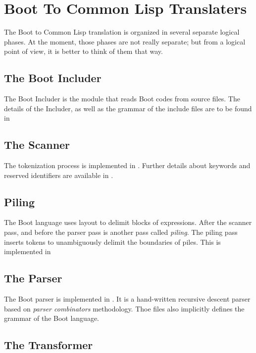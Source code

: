 \documentclass{article}
\begin{document}
\section{Boot To Common Lisp Translaters}
\label{sec:boot-to-cl}

The Boot to Common Lisp translation is organized in several 
separate logical phases.  At the moment, those phases are not
really separate; but from a logical point of view, it is better
to think of them that way.


\subsection{The Boot Includer}
\label{sec:boot-to-cl:includer}

The Boot Includer is the module that reads Boot codes from source files.
The details of the Includer, as well as the grammar of the include
files are to be found in 


\subsection{The Scanner}
\label{sec:boot-to-cl:scanner}

The tokenization process is implemented in .  Further 
details about keywords and reserved identifiers are available in
.


\subsection{Piling}
\label{sec:boot-to-cl:piling}

The Boot language uses layout to delimit blocks of expressions. After
the scanner pass, and before the parser pass is another pass called
\emph{piling}.  The piling pass inserts tokens to unambiguously delimit
the boundaries of piles.  This is implemented in 


\subsection{The Parser}
\label{sec:boot-to-cl:piling}

The Boot parser is implemented in .  It is a hand-written 
recursive descent parser 
based on \emph{parser combinators} methodology.  Thoe files also
implicitly defines the grammar of the Boot language.


\subsection{The Transformer}
\label{sec:boot-to-cl:transfo}
\end{document}
